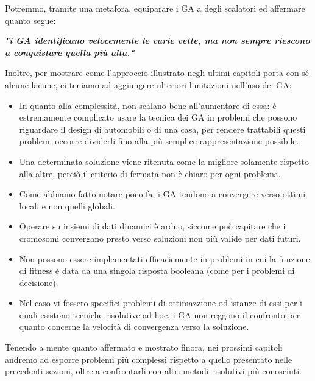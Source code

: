 Potremmo, tramite una metafora, equiparare i GA a degli scalatori ed affermare quanto segue:
\vspace{3mm}

\begin{large}\textit{\textbf{"i GA identificano velocemente le varie vette, ma non sempre riescono a conquistare quella pi\`u alta."}}
\end{large}
\vspace{3mm}

Inoltre, per mostrare come l'approccio illustrato negli ultimi capitoli porta con s\'e alcune lacune, ci teniamo ad aggiungere ulteriori limitazioni nell'uso dei GA:
\begin{itemize}
    \item In quanto alla complessit\`a, non scalano bene all'aumentare di essa: \`e estremamente complicato usare la tecnica dei GA in problemi che possono riguardare il design di automobili o di una casa, per rendere trattabili questi problemi occorre dividerli fino alla pi\`u semplice rappresentazione possibile.
    \item Una determinata soluzione viene ritenuta come la migliore solamente rispetto alla altre, perci\`o il criterio di fermata non \`e chiaro per ogni problema.
    \item Come abbiamo fatto notare poco fa, i GA tendono a convergere verso ottimi locali e non quelli globali.
    \item Operare su insiemi di dati dinamici \`e arduo, siccome pu\`o capitare che i cromosomi convergano presto verso soluzioni non pi\`u valide per dati futuri.
    \item Non possono essere implementati efficaciemente in problemi in cui la funzione di fitness \`e data da una singola risposta booleana (come per i problemi di decisione).
    \item Nel caso vi fossero specifici problemi di ottimazzione od istanze di essi per i quali esistono tecniche risolutive ad hoc, i GA non reggono il confronto per quanto concerne la velocit\`a di convergenza verso la soluzione.
\end{itemize}
Tenendo a mente quanto affermato e mostrato finora, nei prossimi capitoli andremo ad esporre problemi pi\`u complessi rispetto a quello presentato nelle precedenti sezioni, oltre a confrontarli con altri metodi risolutivi pi\`u conosciuti.
\newpage